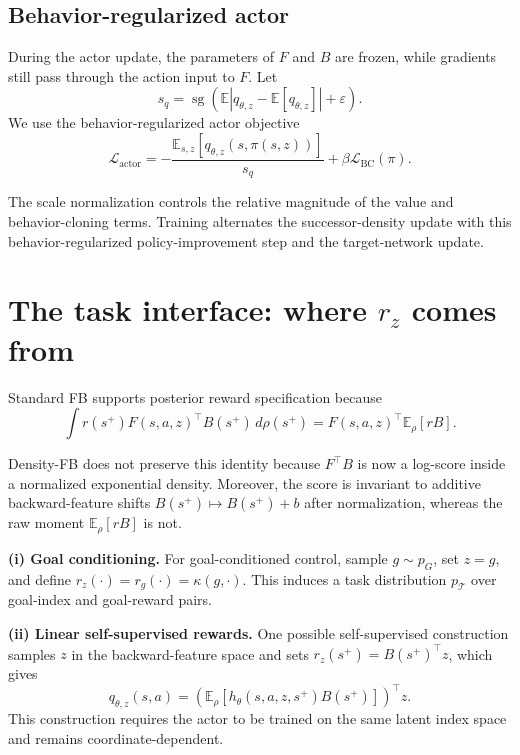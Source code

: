 \documentclass[11pt]{article}
\newcommand{\sg}{\operatorname{sg}}
\begin{document}
\subsection*{Behavior-regularized actor}

During the actor update, the parameters of $F$ and $B$ are frozen, while gradients still pass through the action input to $F$. Let
\[
    s_q = \sg\!\left(\mathbb E\left|q_{\theta,z}-\mathbb E[q_{\theta,z}]\right|+\varepsilon\right).
\]
We use the behavior-regularized actor objective
\begin{equation}
\boxed{
    \mathcal L_{\mathrm{actor}} = -\frac{\mathbb E_{s,z}\left[q_{\theta,z}(s,\pi(s,z))\right]}{s_q} + \beta\mathcal L_{\mathrm{BC}}(\pi).
}
\label{eq:actor-centered}
\end{equation}

The scale normalization controls the relative magnitude of the value and behavior-cloning terms. Training alternates the successor-density update with this behavior-regularized policy-improvement step and the target-network update.

\section{The task interface: where $r_z$ comes from}


Standard FB supports posterior reward specification because
\[
    \int r(s^+)F(s,a,z)^\top B(s^+)\,d\rho(s^+) = F(s,a,z)^\top\mathbb E_\rho[rB].
\]

Density-FB does not preserve this identity because $F^\top B$ is now a log-score inside a normalized exponential density. Moreover, the score is invariant to additive backward-feature shifts $B(s^+)\mapsto B(s^+)+b$ after normalization, whereas the raw moment $\mathbb E_\rho[rB]$ is not.

\textbf{(i) Goal conditioning.}
For goal-conditioned control, sample $g\sim p_G$, set $z=g$, and define $r_z(\cdot)=r_g(\cdot)=\kappa(g,\cdot)$. This induces a task distribution $p_{\mathcal T}$ over goal-index and goal-reward pairs.

\textbf{(ii) Linear self-supervised rewards.}
One possible self-supervised construction samples $z$ in the backward-feature space and sets $r_z(s^+)=B(s^+)^\top z$, which gives
\[
    q_{\theta,z}(s,a) = \left(\mathbb E_\rho\left[h_\theta(s,a,z,s^+)B(s^+)\right]\right)^\top z.
\]
This construction requires the actor to be trained on the same latent index space and remains coordinate-dependent.
\end{document}

